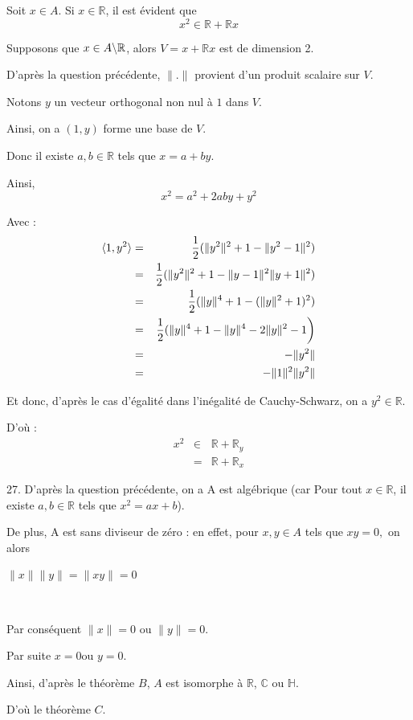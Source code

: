  Soit $x \in A$. Si $x \in \mathbb{R}$, il est {\'e}vident que
\[ x^2 \in \mathbb{R}+\mathbb{R}x \]


Supposons que $x \in A \backslash \mathbb{R} $, alors $V = x
+\mathbb{R}x$ est de dimension 2.

D'apr{\`e}s la question pr{\'e}c{\'e}dente, $\| . \|$ provient d'un produit
scalaire sur $V$.

Notons $y$ un vecteur orthogonal non nul {\`a} $1$ dans $V$.

Ainsi, on a $(1, y)$ forme une base de $V$.

Donc il existe $a, b \in \mathbb{R}$ tels que $x = a + b y$.

Ainsi,
\[ x^2 = a^2 + 2 a b y + y^2 \]


Avec :
\begin{eqnarray*}
  \langle 1, y^2 \rangle & = & \frac{1}{2} (\| y^2 \|^2 + 1 - \| y^2 - 1
  \|^2)\\
  & = & \frac{1}{2} (\| y^2 \|^2 + 1 - \| y  - 1 \|^2 \| y  + 1 \|^2)\\
  & = & \frac{1}{2} (\| y  \|^4 + 1 - (\| y  \|^2 + 1)^2)\\
  & = & \left. \frac{1}{2} (\| y  \|^4 + 1 - \| y  \|^4 - 2 \| y \|^2 - 1
   \right)\\
  & = & - \| y^2 \|\\
  & = & - \| 1 \|^2 \| y^2 \|
\end{eqnarray*}


Et donc, d'apr{\`e}s le cas d'{\'e}galit{\'e} dans l'in{\'e}galit{\'e} de
Cauchy-Schwarz, on a $y^2 \in \mathbb{R}$.

D'o{\`u} :
\begin{eqnarray*}
  x^2 & \in & \mathbb{R}+\mathbb{R}_y\\
  & = & \mathbb{R}+\mathbb{R}_x
\end{eqnarray*}


27. D'apr{\`e}s la question pr{\'e}c{\'e}dente, on a A est alg{\'e}brique (car
Pour tout $x \in \mathbb{R}$, il existe $a, b \in \mathbb{R}$ tels que $x^2 = ax + b$).

De plus, A est sans diviseur de z{\'e}ro : en effet, pour $x, y \in A$ tels
que $x y = 0,$ on alors

$\|x\|\|y\|=\|x y\|= 0$

\ \ \ \ \

Par cons{\'e}quent $\|x\|= 0$ ou $\|y\|= 0.$

Par suite $x = 0$ou $y = 0$.

Ainsi, d'apr{\`e}s le th{\'e}or{\`e}me $B$, $A$ est isomorphe {\`a}
\ensuremath{\mathbb{R}}, \ensuremath{\mathbb{C}} ou \ensuremath{\mathbb{H}}.

D'o{\`u} le th{\'e}or{\`e}me $C$.